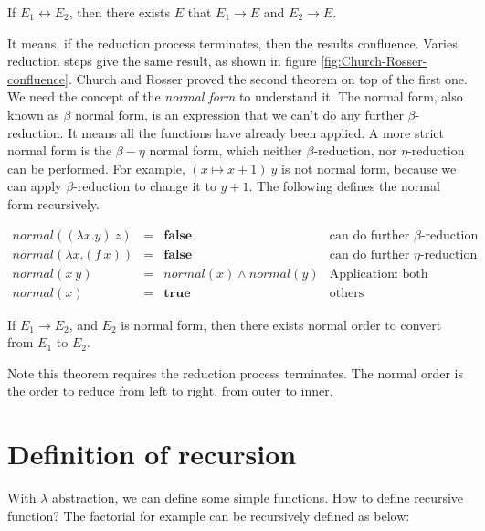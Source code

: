 \documentclass[b5paper]{article}
\begin{document}
\begin{theorem}
If $E_1 \leftrightarrow E_2$, then there exists $E$ that $E_1 \to E$ and $E_2 \to E$.
\end{theorem}

It means, if the reduction process terminates, then the results confluence. Varies reduction steps give the same result, as shown in figure \ref{fig:Church-Rosser-confluence}. Church and Rosser proved the second theorem on top of the first one. We need the concept of the {\em normal form} to understand it. The normal form, also known as $\beta$ normal form, is an expression that we can't do any further $\beta$-reduction. It means all the functions have already been applied. A more strict normal form is the $\beta-\eta$ normal form, which neither $\beta$-reduction, nor $\eta$-reduction can be performed. For example, $(x \mapsto x + 1)\ y$ is not normal form, because we can apply $\beta$-reduction to change it to $y + 1$. The following defines the normal form recursively.

\[
\begin{array}{rcll}
normal((\lambda x . y)\ z) & = & \textbf{false} & \text{can do further $\beta$-reduction} \\
normal(\lambda x . (f\ x)) & = & \textbf{false} & \text{can do further $\eta$-reduction} \\
normal(x\ y) & = & normal(x) \land normal(y) & \text{Application: both function and parameter are normal forms} \\
normal(x) & = & \textbf{true} & \text{others}
\end{array}
\]

\begin{theorem}
If $E_1 \to E_2$, and $E_2$ is normal form, then there exists normal order to convert from $E_1$ to $E_2$.
\end{theorem}

Note this theorem requires the reduction process terminates. The normal order is the order to reduce from left to right, from outer to inner.

\section{Definition of recursion}

With $\lambda$ abstraction, we can define some simple functions. How to define recursive function? The factorial for example can be recursively defined as below:
\end{document}
